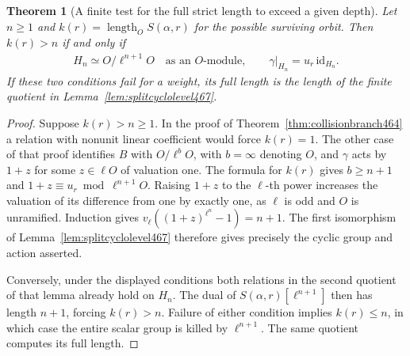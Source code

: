 \documentclass[a4paper,11pt]{article}
\newtheorem{theorem}[proposition]{Theorem}
\theoremstyle{definition}
\theoremstyle{remark}
\numberwithin{equation}{section}
\begin{document}
\begin{theorem}[A finite test for the full strict length to exceed a given depth]\leavevmode
\label{thm:scalarlevel467}
Let \(n\ge1\) and \(k(r)=\operatorname{length}_O S(\alpha,r)\)
for the possible surviving orbit. Then \(k(r)>n\) if and only if
\[
 \begin{gathered}
         H_n\simeq O/\ell^{n+1}O\quad\text{as an \(O\)-module},
         \qquad
         \gamma|_{H_n}=u_r\,\mathrm{id}_{H_n}.
 \end{gathered}
\]
If these two conditions fail for a weight, its full length is
the length of the finite quotient in
Lemma~\ref{lem:splitcyclolevel467}.
\end{theorem}
\begin{proof}
Suppose \(k(r)>n\ge1\). In the proof of
Theorem~\ref{thm:collisionbranch464} a relation with nonunit
linear coefficient would force \(k(r)=1\). The other
case of that proof identifies \(B\) with \(O/\ell^bO\), with
\(b=\infty\) denoting \(O\), and \(\gamma\) acts by \(1+z\)
for some \(z\in\ell O\) of valuation one. The formula for
\(k(r)\) gives \(b\ge n+1\) and \(1+z\equiv u_r\bmod
\ell^{n+1}O\). Raising \(1+z\) to the \(\ell\)-th power
increases the valuation of its difference from one by exactly
one, as \(\ell\) is odd and \(O\) is unramified. Induction
gives \(v_\ell((1+z)^{\ell^n}-1)=n+1\). The first isomorphism
of Lemma~\ref{lem:splitcyclolevel467} therefore gives precisely
the cyclic group and action asserted.

Conversely, under the displayed conditions both relations in
the second quotient of that lemma already hold on \(H_n\).
The dual of \(S(\alpha,r)[\ell^{n+1}]\) then has length
\(n+1\), forcing \(k(r)>n\). Failure of either condition
implies \(k(r)\le n\), in which case the entire scalar group
is killed by \(\ell^{n+1}\). The same quotient computes its
full length.
\end{proof}
\end{document}
